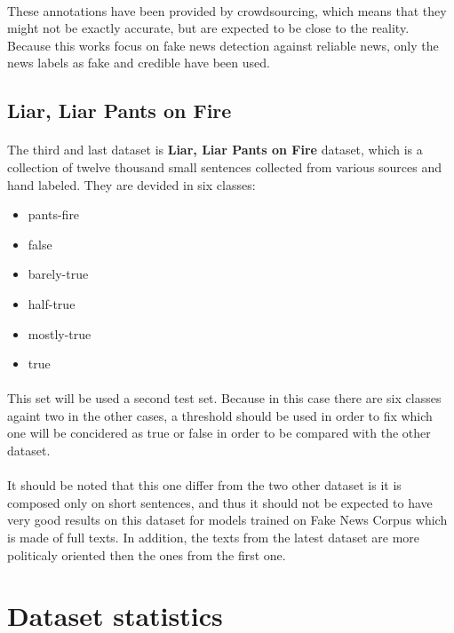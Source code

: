 \paragraph{}
These annotations have been provided by crowdsourcing, which means that they might not be exactly accurate, but are expected to be close to the reality. Because this works focus on fake news detection against reliable news, only the news labels as fake and credible have been used. 

\subsection{Liar, Liar Pants on Fire}
\paragraph{}
The third and last dataset is \textbf{Liar, Liar Pants on Fire} dataset\cite{Wang2017}, which is a collection of twelve thousand small sentences collected from various sources and hand labeled. They are devided in six classes:
\begin{itemize}
  \item pants-fire
  \item false
  \item barely-true
  \item half-true
  \item mostly-true
  \item true
\end{itemize} 
\paragraph{}
This set will be used a second test set. Because in this case there are six classes againt two in the other cases, a threshold should be used in order to fix which one will be concidered as true or false in order to be compared with the other dataset.  
\paragraph{}
It should be noted that this one differ from the two other dataset is it is composed only on short sentences, and thus it should not be expected to have very good results on this dataset for models trained on Fake News Corpus which is made of full texts. In addition, the texts from the latest dataset are more politicaly oriented then the ones from the first one. 

\section{Dataset statistics}
